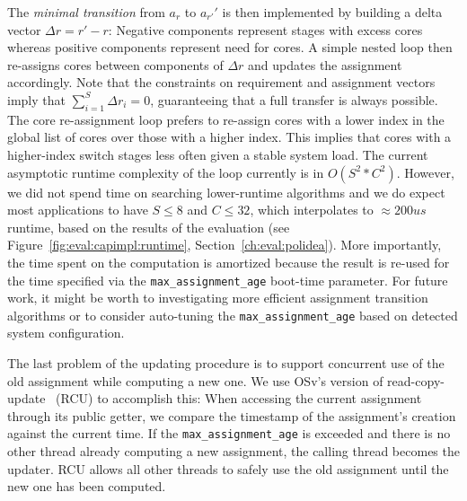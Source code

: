 \documentclass[12pt,a4paper]{book}
\begin{document}
The \emph{minimal transition} from $a_r$ to $a_{r'}'$ is then implemented by building a delta vector ${\Delta r = r' - r}$:
Negative components represent stages with excess cores whereas positive components represent need for cores.
A simple nested loop then re-assigns cores between components of $\Delta r$ and updates the assignment accordingly.
Note that the constraints on requirement and assignment vectors imply that ${\sum_{i = 1}^{S} \Delta r_i = 0}$, guaranteeing that a full transfer is always possible.
The core re-assignment loop prefers to re-assign cores with a lower index in the global list of cores over those with a higher index.
This implies that cores with a higher-index switch stages less often given a stable system load.
The current asymptotic runtime complexity of the loop currently is in $O(S^2 * C^2)$.
However, we did not spend time on searching lower-runtime algorithms and we do expect most applications to have $S \le 8$ and $C \le 32$, which interpolates to $\approx 200us$ runtime, based on the results of the evaluation (see Figure~\ref{fig:eval:capimpl:runtime}, Section~\ref{ch:eval:polidea}). %
More importantly, the time spent on the computation is amortized because the result is re-used for the time specified via the \lstinline[style=figurecpp]{max_assignment_age} boot-time parameter.
For future work, it might be worth to investigating more efficient assignment transition algorithms or to consider auto-tuning the \lstinline[style=figurecpp]{max_assignment_age} based on detected system configuration.

The last problem of the updating procedure is to support concurrent use of the old assignment while computing a new one.
We use OSv's version of read-copy-update~\cite{readCopyUpdate} (RCU) to accomplish this:
When accessing the current assignment through its public getter, we compare the timestamp of the assignment's creation against the current time.
If the \lstinline[style=figurecpp]{max_assignment_age} is exceeded and there is no other thread already computing a new assignment, the calling thread becomes the updater.
RCU allows all other threads to safely use the old assignment until the new one has been computed.
\end{document}
